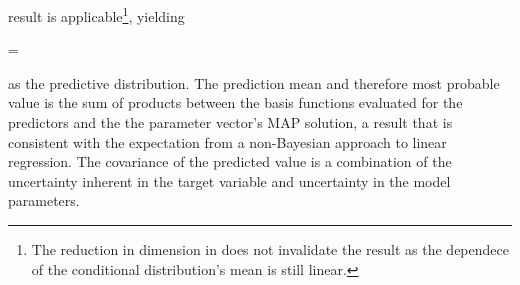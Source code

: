     result  is applicable\footnote{The reduction in
    dimension in  does not invalidate the result as the
    dependece of the conditional distribution's mean is still linear.},
    yielding

    \startformula
        \RPREDICT = 
    \stopformula

    as the predictive distribution. The prediction mean and therefore most
    probable value is the sum of products between the basis functions evaluated
    for the predictors and the the parameter vector's MAP solution, a result
    that is consistent with the expectation from a non-Bayesian approach to
    linear regression. The covariance of the predicted value is a combination
    of the uncertainty inherent in the target variable and uncertainty in the
    model parameters.

        {}

